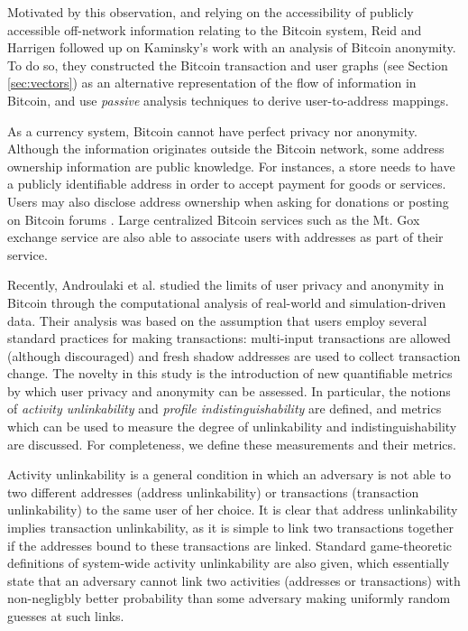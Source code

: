 Motivated by this observation, and relying on the accessibility of publicly accessible off-network information relating to the Bitcoin system, Reid and Harrigen \cite{ReidHarrigan13} followed up on Kaminsky's work with an analysis of Bitcoin anonymity. To do so, they constructed the Bitcoin transaction and user graphs (see Section \ref{sec:vectors}) as an alternative representation of the flow of information in Bitcoin, and use \emph{passive} analysis techniques to derive user-to-address mappings. 


As a currency system, Bitcoin cannot have perfect privacy nor anonymity. Although the information originates outside the Bitcoin network, some address ownership information are public knowledge. For instances, a store needs to have a publicly identifiable address in order to accept payment for goods or services. Users may also disclose address ownership when asking for donations or posting on Bitcoin forums \cite{Fistful12}. Large centralized Bitcoin services such as the Mt. Gox exchange service are also able to associate users with addresses as part of their service.

Recently, Androulaki et al. \cite{Androulaki12-privacy} studied the limits of user privacy and anonymity in Bitcoin through the computational analysis of real-world and simulation-driven data. Their analysis was based on the assumption that users employ several standard practices for making transactions: multi-input transactions are allowed (although discouraged) and fresh shadow addresses are used to collect transaction change. The novelty in this study is the introduction of new quantifiable metrics by which user privacy and anonymity can be assessed. In particular, the notions of \emph{activity unlinkability} and \emph{profile indistinguishability} are defined, and metrics which can be used to measure the degree of unlinkability and indistinguishability are discussed. For completeness, we define these measurements and their metrics. 

Activity unlinkability is a general condition in which an adversary is not able to two different addresses (address unlinkability) or transactions (transaction unlinkability) to the same user of her choice. It is clear that address unlinkability implies transaction unlinkability, as it is simple to link two transactions together if the addresses bound to these transactions are linked. Standard game-theoretic definitions of system-wide activity unlinkability are also given, which essentially state that an adversary cannot link two activities (addresses or transactions) with non-negligbly better probability than some adversary making uniformly random guesses at such links.

